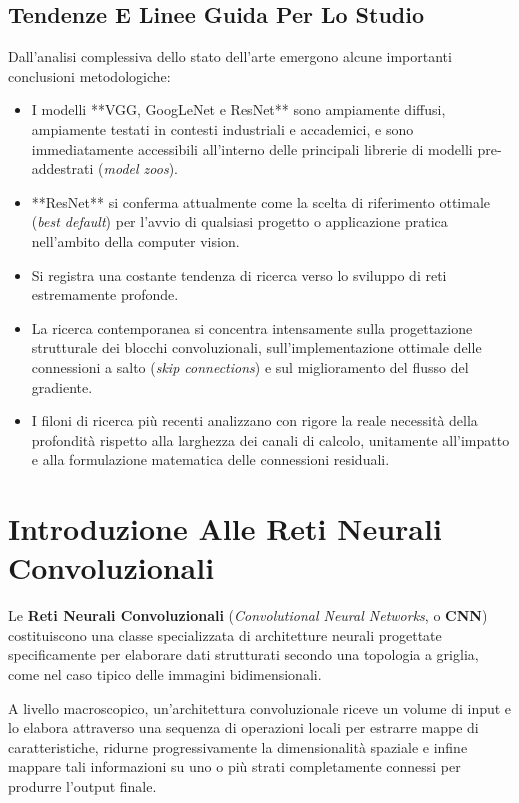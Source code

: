 ﻿\documentclass[11pt, a4paper]{article}
\begin{document}
\subsection{Tendenze E Linee Guida Per Lo Studio}

Dall'analisi complessiva dello stato dell'arte emergono alcune importanti conclusioni metodologiche:

\begin{itemize}
    \item I modelli **VGG, GoogLeNet e ResNet** sono ampiamente diffusi, ampiamente testati in contesti industriali e accademici, e sono immediatamente accessibili all'interno delle principali librerie di modelli pre-addestrati (\emph{model zoos}).
    \item **ResNet** si conferma attualmente come la scelta di riferimento ottimale (\emph{best default}) per l'avvio di qualsiasi progetto o applicazione pratica nell'ambito della computer vision.
    \item Si registra una costante tendenza di ricerca verso lo sviluppo di reti estremamente profonde.
    \item La ricerca contemporanea si concentra intensamente sulla progettazione strutturale dei blocchi convoluzionali, sull'implementazione ottimale delle connessioni a salto (\emph{skip connections}) e sul miglioramento del flusso del gradiente.
    \item I filoni di ricerca più recenti analizzano con rigore la reale necessità della profondità rispetto alla larghezza dei canali di calcolo, unitamente all'impatto e alla formulazione matematica delle connessioni residuali.
\end{itemize}


\section{Introduzione Alle Reti Neurali Convoluzionali}

Le \textbf{Reti Neurali Convoluzionali} (\emph{Convolutional Neural Networks}, o \textbf{CNN}) costituiscono una classe specializzata di architetture neurali progettate specificamente per elaborare dati strutturati secondo una topologia a griglia, come nel caso tipico delle immagini bidimensionali.

A livello macroscopico, un'architettura convoluzionale riceve un volume di input e lo elabora attraverso una sequenza di operazioni locali per estrarre mappe di caratteristiche, ridurne progressivamente la dimensionalità spaziale e infine mappare tali informazioni su uno o più strati completamente connessi per produrre l'output finale.
\end{document}
